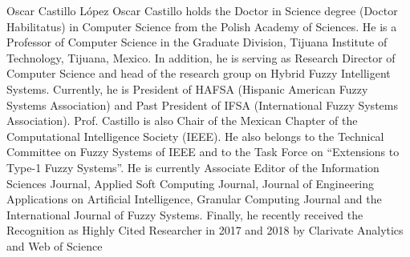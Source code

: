 \documentclass{ieeeaccess}
\begin{document}
\begin{IEEEbiography}{Oscar
Castillo López} Oscar Castillo holds the Doctor in Science degree (Doctor
Habilitatus) in Computer Science from the Polish Academy of Sciences.
He is a Professor of Computer Science in the Graduate Division, Tijuana
Institute of Technology, Tijuana, Mexico. In addition, he is serving as Research
Director of Computer Science and head of the research group on Hybrid Fuzzy
Intelligent Systems. Currently, he is President of HAFSA (Hispanic American
Fuzzy Systems Association) and Past President of IFSA (International Fuzzy
Systems Association). Prof. Castillo is also Chair of the Mexican Chapter of the
Computational Intelligence Society (IEEE). He also belongs to the Technical
Committee on Fuzzy Systems of IEEE and to the Task Force on “Extensions to
Type-1 Fuzzy Systems”. He is currently Associate Editor of the Information
Sciences Journal, Applied Soft Computing Journal, Journal of Engineering
Applications on Artificial Intelligence, Granular Computing Journal and the
International Journal of Fuzzy Systems. Finally, he recently received the Recognition as
Highly Cited Researcher in 2017 and 2018 by Clarivate Analytics and Web of
Science \end{IEEEbiography}




\EOD
\end{document}
